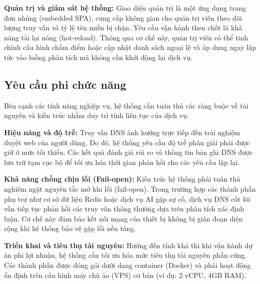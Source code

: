 \textbf{Quản trị và giám sát hệ thống:}
Giao diện quản trị là một ứng dụng trang đơn nhúng (embedded SPA), cung cấp không gian cho quản trị viên theo dõi lượng truy vấn và tỷ lệ tên miền bị chặn. Yêu cầu vận hành then chốt là khả năng tải lại nóng (hot-reload). Thông qua cơ chế này, quản trị viên có thể tinh chỉnh cấu hình chấm điểm hoặc cập nhật danh sách ngoại lệ và áp dụng ngay lập tức vào luồng phân tích mà không cần khởi động lại dịch vụ.

\subsection{Yêu cầu phi chức năng}

Bên cạnh các tính năng nghiệp vụ, hệ thống cần tuân thủ các ràng buộc về tài nguyên và kiến trúc nhằm duy trì tính liên tục của dịch vụ.

\textbf{Hiệu năng và độ trễ:}
Truy vấn DNS ảnh hưởng trực tiếp đến trải nghiệm duyệt web của người dùng. Do đó, hệ thống yêu cầu độ trễ phân giải phải được giữ ở mức tối thiểu. Các kết quả đánh giá rủi ro và thông tin bản ghi DNS được lưu trữ tạm cục bộ để tối ưu hóa thời gian phản hồi cho các yêu cầu lặp lại.

\textbf{Khả năng chống chịu lỗi (Fail-open):}
Kiến trúc hệ thống phải tuân thủ nghiêm ngặt nguyên tắc mở khi lỗi (fail-open). Trong trường hợp các thành phần phụ trợ như cơ sở dữ liệu Redis hoặc dịch vụ AI gặp sự cố, dịch vụ DNS cốt lõi vẫn tiếp tục phản hồi các truy vấn thông thường dựa trên phân tích xác định luận. Cơ chế này đảm bảo kết nối mạng của thiết bị không bị gián đoạn diện rộng khi hệ thống bảo vệ gặp lỗi nền tảng.

\textbf{Triển khai và tiêu thụ tài nguyên:}
Hướng đến tính khả thi khi vận hành dự án phi lợi nhuận, hệ thống cần tối ưu hóa mức tiêu thụ tài nguyên phần cứng. Các thành phần được đóng gói dưới dạng container (Docker) và phải hoạt động ổn định trên cấu hình máy chủ ảo (VPS) cơ bản (ví dụ: 2 vCPU, 4GB RAM).
